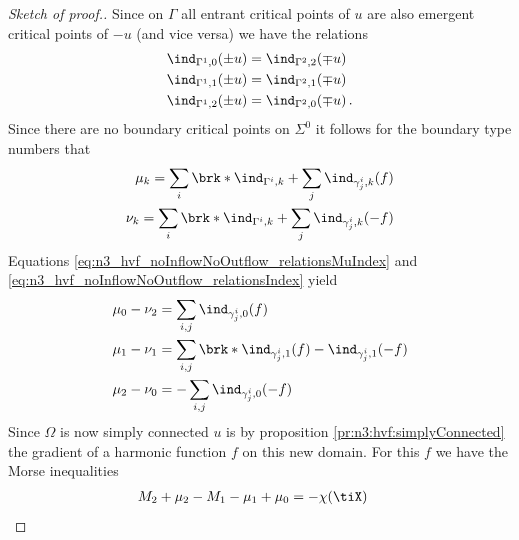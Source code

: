 \begin{proof}[Sketch of proof.]
  Since on $\Gamma$ all entrant critical points of $u$ are also emergent
  critical points of $-u$ (and vice versa) we have the relations
  \begin{equation}
    \begin{aligned}
    \ind_{\Gamma^1,0}(\pm u)&=\ind_{\Gamma^2,2}(\mp u) \\
    \ind_{\Gamma^1,1}(\pm u)&=\ind_{\Gamma^2,1}(\mp u) \\
    \ind_{\Gamma^1,2}(\pm u)&=\ind_{\Gamma^2,0}(\mp u)\,.
    \end{aligned}\label{eq:n3_hvf_noInflowNoOutflow_relationsIndex}
  \end{equation}
  Since there are no boundary critical points on $\Sigma^0$ it follows for the 
  boundary type numbers that
  \begin{align*}
    \mu_k=\sum_i\brk*{\ind_{\Gamma^i,k}+\sum_j\ind_{\gamma_j^i,k}}(f) \\
    \nu_k=\sum_i\brk*{\ind_{\Gamma^i,k}+\sum_j\ind_{\gamma_j^i,k}}(-f)\label{eq:n3_hvf_noInflowNoOutflow_relationsMuIndex}
  \end{align*}
  Equations \eqref{eq:n3_hvf_noInflowNoOutflow_relationsMuIndex} and \eqref{eq:n3_hvf_noInflowNoOutflow_relationsIndex}
  yield 
  \begin{equation}
    \begin{aligned}
    \mu_0-\nu_2&=\sum_{i,j}\ind_{\gamma_j^i,0}(f) \\
    \mu_1-\nu_1&=\sum_{i,j}\brk*{\ind_{\gamma_j^i,1}(f)-\ind_{\gamma_j^i,1}(-f)} \\
    \mu_2-\nu_0&=-\sum_{i,j}\ind_{\gamma_j^i,0}(-f)
    \end{aligned}
    \label{eq:n3_hvf_noInflowNoOutflow_relationsMuNu}
  \end{equation}
  Since $\Omega$ is now simply connected $u$ is 
  by proposition \ref{pr:n3:hvf:simplyConnected}
  the gradient of a harmonic function $f$ on this new domain.
  For this $f$ we have the Morse inequalities
  \begin{align} 
    M_2+\mu_2-M_1-\mu_1+\mu_0&=-\chi(\tiX) \label{eq:n3_hvf_MorseInequalities_1}

\end{align}
\end{proof}
